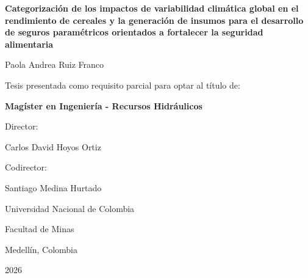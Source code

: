 \begin{titlepage}
  \centering
  \vspace*{1cm}

  {\Large \textbf{Categorización de los impactos de variabilidad climática global en el rendimiento de cereales y la generación de insumos para el desarrollo de seguros paramétricos orientados a fortalecer la seguridad alimentaria}\par}

  \vspace{2.5cm}

  {\large Paola Andrea Ruiz Franco\par}

  \vspace{2cm}

  {\large Tesis presentada como requisito parcial para optar al título de:\par}
  \vspace{0.3cm}
  {\large \textbf{Magíster en Ingeniería - Recursos Hidráulicos}\par}

  \vspace{2cm}

  {\large Director:\par}
  \vspace{0.3cm}
  {\large Carlos David Hoyos Ortiz\par}

  \vspace{0.6cm}

  {\large Codirector:\par}
  \vspace{0.3cm}
  {\large Santiago Medina Hurtado\par}

  \vfill

  {\large Universidad Nacional de Colombia\par}
  {\large Facultad de Minas\par}
  {\large Medellín, Colombia\par}
  {\large 2026\par}
\end{titlepage}
